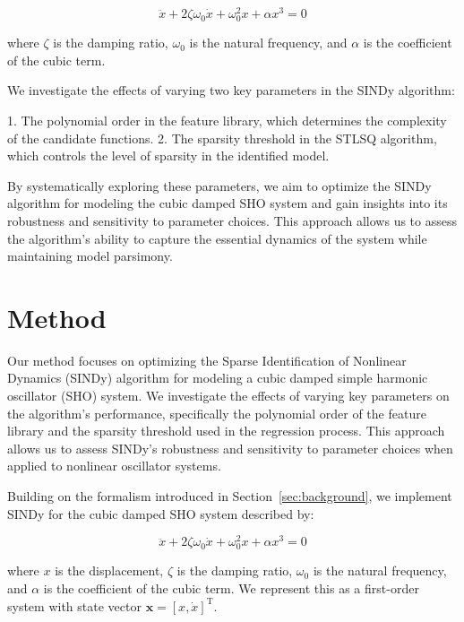 \documentclass{article} %
\begin{document}
\begin{equation}
    \ddot{x} + 2\zeta\omega_0\dot{x} + \omega_0^2x + \alpha x^3 = 0
\end{equation}

where $\zeta$ is the damping ratio, $\omega_0$ is the natural frequency, and $\alpha$ is the coefficient of the cubic term.

We investigate the effects of varying two key parameters in the SINDy algorithm:

1. The polynomial order in the feature library, which determines the complexity of the candidate functions.
2. The sparsity threshold in the STLSQ algorithm, which controls the level of sparsity in the identified model.

By systematically exploring these parameters, we aim to optimize the SINDy algorithm for modeling the cubic damped SHO system and gain insights into its robustness and sensitivity to parameter choices. This approach allows us to assess the algorithm's ability to capture the essential dynamics of the system while maintaining model parsimony.

\section{Method}
\label{sec:method}

Our method focuses on optimizing the Sparse Identification of Nonlinear Dynamics (SINDy) algorithm for modeling a cubic damped simple harmonic oscillator (SHO) system. We investigate the effects of varying key parameters on the algorithm's performance, specifically the polynomial order of the feature library and the sparsity threshold used in the regression process. This approach allows us to assess SINDy's robustness and sensitivity to parameter choices when applied to nonlinear oscillator systems.

Building on the formalism introduced in Section~\ref{sec:background}, we implement SINDy for the cubic damped SHO system described by:

\begin{equation}
    \ddot{x} + 2\zeta\omega_0\dot{x} + \omega_0^2x + \alpha x^3 = 0
\end{equation}

where $x$ is the displacement, $\zeta$ is the damping ratio, $\omega_0$ is the natural frequency, and $\alpha$ is the coefficient of the cubic term. We represent this as a first-order system with state vector $\mathbf{x} = [x, \dot{x}]^{\mathrm{T}}$.
\end{document}
